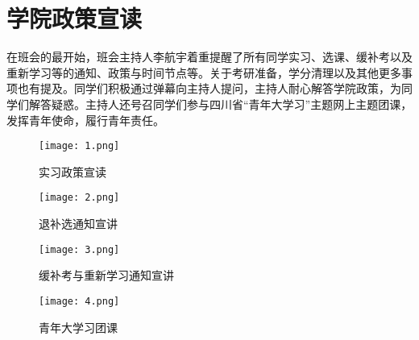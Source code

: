 \documentclass[UTF8]{ctexart}
\begin{document}
	\title{\vspace{2em}}
	\section*{学院政策宣读}
	\title{\vspace{1em}}
	\par{在班会的最开始，班会主持人李航宇着重提醒了所有同学实习、选课、缓补考以及重新学习等的通知、政策与时间节点等。关于考研准备，学分清理以及其他更多事项也有提及。同学们积极通过弹幕向主持人提问，主持人耐心解答学院政策，为同学们解答疑惑。主持人还号召同学们参与四川省“青年大学习”主题网上主题团课，发挥青年使命，履行青年责任。}
	
	\title{\vspace{1em}}
	\begin{figure}[H]
		\centering
		\begin{center}{}
			\begin{minipage}[t]{4.5in}
				\texttt{[image: 1.png]}
				\caption*{\kaishu 实习政策宣读}
			\end{minipage}
		\end{center}
	\end{figure}
	\title{\vspace{1em}}
	\begin{figure}[H]
		\centering
		\begin{center}{}
			\begin{minipage}[t]{4.5in}
				\texttt{[image: 2.png]}
				\caption*{\kaishu 退补选通知宣讲}
			\end{minipage}
		\end{center}
	\end{figure}
	\title{\vspace{1em}}
	\begin{figure}[H]
		\centering
		\begin{center}{}
			\begin{minipage}[t]{4.5in}
				\texttt{[image: 3.png]}
				\caption*{\kaishu 缓补考与重新学习通知宣讲}
				\end{minipage}
			\end{center}
		\end{figure}
	\title{\vspace{1em}}
	\begin{figure}[H]
		\centering
		\begin{center}{}
			\begin{minipage}[t]{4.5in}
				\texttt{[image: 4.png]}
				\caption*{\kaishu 青年大学习团课}
			\end{minipage}
		\end{center}
	\end{figure}
	
\end{document}
